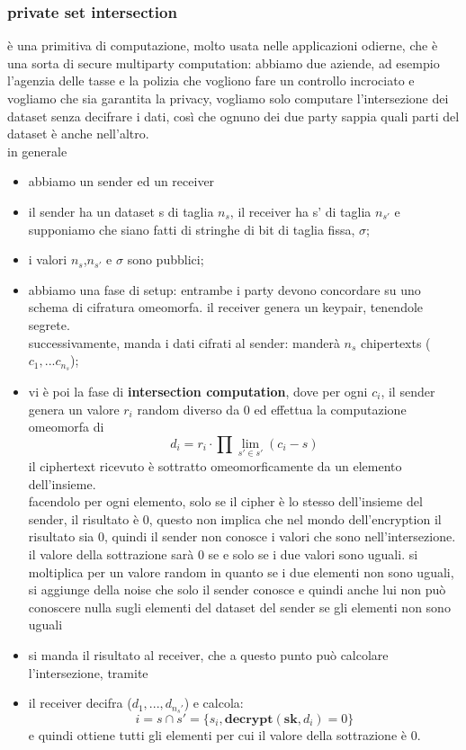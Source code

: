 \documentclass[12pt, oneside]{extbook} %
\begin{document}
\subsubsection{private set intersection}
è una primitiva di computazione, molto usata nelle applicazioni odierne, che è una sorta di secure multiparty computation: abbiamo due aziende, ad esempio l'agenzia delle tasse e la polizia che vogliono fare un controllo incrociato e vogliamo che sia garantita la privacy, vogliamo solo computare l'intersezione dei dataset senza decifrare i dati, così che ognuno dei due party sappia quali parti del dataset è anche nell'altro.\\in generale
\begin{itemize}
	\item abbiamo un sender ed un receiver
	\item il sender ha un dataset s di taglia $n_s$, il receiver ha s' di taglia $n_{s'}$ e supponiamo che siano fatti di stringhe di bit di taglia fissa, $\sigma$;
	\item i valori $n_s$,$n_{s'}$ e $\sigma$ sono pubblici;
	\item abbiamo una fase di setup: entrambe i party devono concordare su uno schema di cifratura omeomorfa. il receiver genera un keypair, tenendole segrete.\\ successivamente, manda i dati cifrati al sender: manderà $n_s$ chipertexts ($c_1,...c_{n_s}$);
	\item vi è poi la fase di \textbf{intersection computation}, dove per ogni $c_i$, il sender genera un valore $r_i$ random diverso da 0 ed effettua la computazione omeomorfa di
	\begin{equation}
		d_i = r_i \cdot \prod\lim\limits_{s' \in s'} (c_i - s)
	\end{equation}
	il ciphertext ricevuto è sottratto omeomorficamente da un elemento dell'insieme.\\facendolo per ogni elemento, solo se il cipher è lo stesso dell'insieme del sender, il risultato è 0, questo non implica che nel mondo dell'encryption il risultato sia 0, quindi il sender non conosce i valori che sono nell'intersezione. il valore della sottrazione sarà 0 se e solo se i due valori sono uguali. si moltiplica per un valore random in quanto se i due elementi non sono uguali, si aggiunge della noise che solo il sender conosce e quindi anche lui non può conoscere nulla sugli elementi del dataset del sender se gli elementi non sono uguali
	\item si manda il risultato al receiver, che a questo punto può calcolare l'intersezione, tramite 
	\item il receiver decifra ($d_1, ...,d_{n_s'}$) e calcola:
	\begin{equation}
		i = s \cap s' = \{s_i, \textbf{decrypt}(\textbf{sk}, d_i) = 0\}
	\end{equation}
	e quindi ottiene tutti gli elementi per cui il valore della sottrazione è 0.
\end{itemize}
\end{document}
